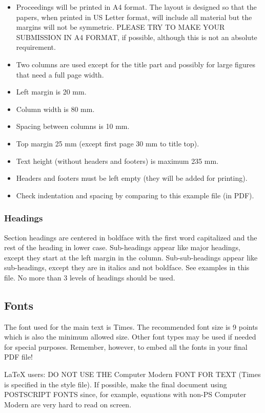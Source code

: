 \documentclass[a4paper]{article}
\begin{document}
\begin{itemize}
\item Proceedings will be printed in A4 format. The layout is
designed so that the papers, when printed in US Letter format, will include
all material but the margins will not be symmetric. PLEASE TRY TO MAKE YOUR
SUBMISSION IN A4 FORMAT, if possible, although this is not an
absolute requirement. \item Two columns are used except for the
title part and possibly for large figures that need a full page
width. \item Left margin is 20 mm. \item Column width is 80 mm.
\item Spacing between columns is 10 mm. \item Top margin 25 mm
(except first page 30 mm to title top). \item Text height (without
headers and footers) is maximum 235 mm. \item Headers and footers
must be left empty (they will be added for printing). \item Check
indentation and spacing by comparing to this example file (in
PDF).
\end{itemize}


\subsubsection{Headings}

Section headings are centered in boldface
with the first word capitalized and the rest of the heading in
lower case. Sub-headings appear like major headings, except they
start at the left margin in the column.
Sub-sub-headings appear like sub-headings, except they are in italics
and not boldface. See examples in this
file. No more than 3 levels of headings should be used.

\subsection{Fonts}

The font used for the main text is Times. The recommended
font size is 9 points which is also the minimum allowed size.
Other font types may be used if needed for special purposes. Remember, 
however, to embed all the fonts in your final PDF file!

LaTeX users: DO NOT USE THE Computer Modern FONT FOR TEXT (Times is
specified in the style file). If possible, make the final
document using POSTSCRIPT FONTS since, for example, equations with
non-PS Computer Modern are very hard to read on screen.
\end{document}
